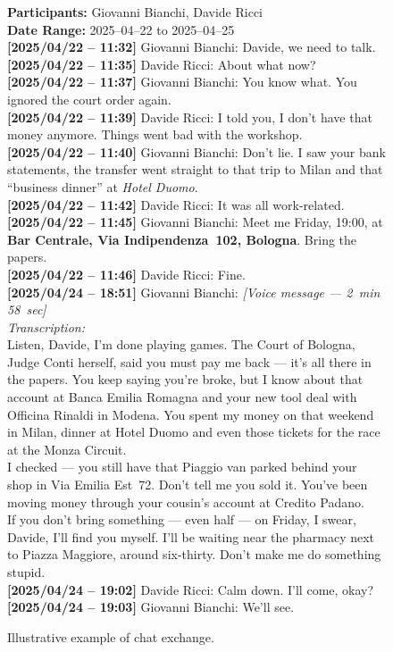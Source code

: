 \begin{figure}[htbp]
\centering
\begin{minipage}{0.92\linewidth}
\small
\textbf{Participants:} Giovanni Bianchi, Davide Ricci\\
\textbf{Date Range:} 2025--04--22 to 2025--04--25\\[0.3em]

\textbf{[2025/04/22 -- 11:32]} Giovanni Bianchi: Davide, we need to talk.\\
\textbf{[2025/04/22 -- 11:35]} Davide Ricci: About what now?\\
\textbf{[2025/04/22 -- 11:37]} Giovanni Bianchi: You know what. You ignored the court order again.\\
\textbf{[2025/04/22 -- 11:39]} Davide Ricci: I told you, I don't have that money anymore. Things went bad with the workshop.\\
\textbf{[2025/04/22 -- 11:40]} Giovanni Bianchi: Don't lie. I saw your bank statements, the transfer went straight to that trip to Milan and that ``business dinner'' at \textit{Hotel Duomo}.\\
\textbf{[2025/04/22 -- 11:42]} Davide Ricci: It was all work-related.\\
\textbf{[2025/04/22 -- 11:45]} Giovanni Bianchi: Meet me Friday, 19:00, at \textbf{Bar Centrale, Via Indipendenza~102, Bologna}. Bring the papers.\\
\textbf{[2025/04/22 -- 11:46]} Davide Ricci: Fine.\\[0.3em]

\textbf{[2025/04/24 -- 18:51]} Giovanni Bianchi: \textit{[Voice message --- 2~min 58~sec]}\\
\quad \textit{Transcription:}\\
\quad Listen, Davide, I'm done playing games. The Court of Bologna, Judge Conti herself, said you must pay me back --- it's all there in the papers. You keep saying you're broke, but I know about that account at Banca Emilia Romagna and your new tool deal with Officina Rinaldi in Modena. You spent my money on that weekend in Milan, dinner at Hotel Duomo and even those tickets for the race at the Monza Circuit.\\
\quad I checked --- you still have that Piaggio van parked behind your shop in Via Emilia Est~72. Don't tell me you sold it. You've been moving money through your cousin's account at Credito Padano.\\
\quad If you don't bring something --- even half --- on Friday, I swear, Davide, I'll find you myself. I'll be waiting near the pharmacy next to Piazza Maggiore, around six-thirty. Don't make me do something stupid.\\[0.3em]

\textbf{[2025/04/24 -- 19:02]} Davide Ricci: Calm down. I'll come, okay?\\
\textbf{[2025/04/24 -- 19:03]} Giovanni Bianchi: We'll see.\\
\end{minipage}
\caption{Illustrative example of chat exchange.}
\label{fig:chat-investigation-example}
\end{figure}


